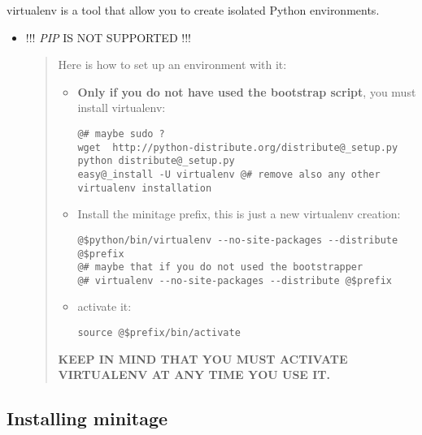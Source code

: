 \documentclass[letterpaper,10pt,english]{sphinxmanual}
\begin{document}
virtualenv is a tool that allow you to create isolated Python
environments.
\begin{itemize}
\item {} 
!!!  \emph{PIP} IS NOT SUPPORTED !!!
\begin{quote}

Here is how to set up an environment with it:
\begin{itemize}
\item {} 
\textbf{Only if you do not have used the bootstrap script}, you must install virtualenv:

\begin{Verbatim}[commandchars=@\[\]]
@# maybe sudo ?
wget  http://python-distribute.org/distribute@_setup.py
python distribute@_setup.py
easy@_install -U virtualenv @# remove also any other virtualenv installation
\end{Verbatim}

\item {} 
Install the minitage prefix, this is just a new virtualenv creation:

\begin{Verbatim}[commandchars=@\[\]]
@$python/bin/virtualenv --no-site-packages --distribute @$prefix
@# maybe that if you do not used the bootstrapper
@# virtualenv --no-site-packages --distribute @$prefix
\end{Verbatim}

\item {} 
activate it:

\begin{Verbatim}[commandchars=@\[\]]
source @$prefix/bin/activate
\end{Verbatim}

\end{itemize}

\textbf{KEEP IN MIND THAT YOU MUST ACTIVATE VIRTUALENV AT ANY TIME YOU USE IT.}
\end{quote}

\end{itemize}


\subsection{Installing minitage}
\label{installation:installing-minitage}
\end{document}
